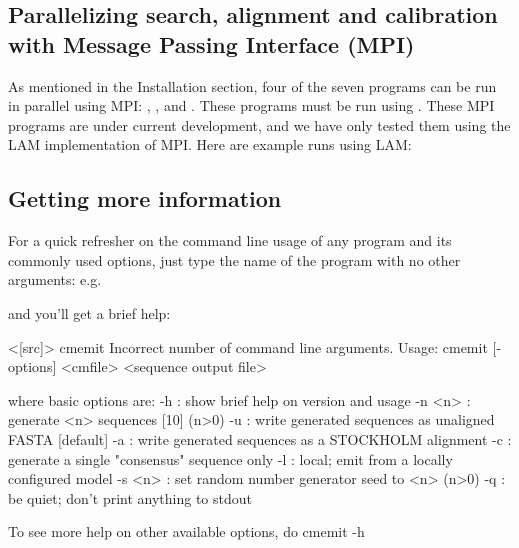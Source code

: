 
\subsection{Parallelizing search, alignment and calibration with Message Passing
  Interface (MPI)}
As mentioned in the Installation section, four of
the seven  programs can be run in parallel using
MPI: , ,  and .
These programs must be run using . These MPI programs are
under current development, and we have only tested them using the LAM
implementation of MPI. Here are example runs using LAM:  





\subsection{Getting more information}

For a quick refresher on the command line usage of any program and its
commonly used options, just type the name of the program with no other
arguments: e.g.\


and you'll get a brief help:

\begin{sreoutput}
<[src]> cmemit
Incorrect number of command line arguments.
Usage: cmemit [-options] <cmfile> <sequence output file>

  where basic options are:
  -h           : show brief help on version and usage
  -n <n>       : generate <n> sequences  [10]  (n>0)
  -u           : write generated sequences as unaligned FASTA  [default]
  -a           : write generated sequences as a STOCKHOLM alignment
  -c           : generate a single "consensus" sequence only
  -l           : local; emit from a locally configured model
  -s <n>       : set random number generator seed to <n>  (n>0)
  -q           : be quiet; don't print anything to stdout

\end{sreoutput}
To see more help on other available options, do cmemit -h

